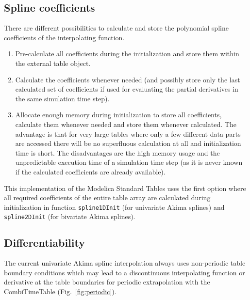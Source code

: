 \documentclass[11pt,a4paper,twocolumn]{article}
\begin{document}
\subsection{Spline coefficients}
There are different possibilities to calculate and store the polynomial spline coefficients of the interpolating function.
\begin{enumerate}
\item Pre-calculate all coefficients during the initialization and store them within the external table object.
\item Calculate the coefficients whenever needed (and possibly store only the last calculated set of coefficients if used for evaluating the partial derivatives in the same simulation time step).
\item Allocate enough memory during initialization to store all coefficients, calculate them whenever needed and store them whenever calculated. The advantage is that for very large tables where only a few different data parts are accessed there will be no superfluous calculation at all and initialization time is short. The disadvantages are the high memory usage and the unpredictable execution time of a simulation time step (as it is never known if the calculated coefficients are already available).
\end{enumerate}
This implementation of the Mod\-el\-ica Standard Tables uses the first option where all required coefficients of the entire table array are calculated during initialization in function \texttt{spline1DInit} (for univariate Akima splines) and \texttt{spline2DInit} (for bivariate Akima splines).

\subsection{Differentiability}
The current univariate Akima spline interpolation always uses non-periodic table boundary conditions which may lead to a discontinuous interpolating function or derivative at the table boundaries for periodic extrapolation with the CombiTimeTable (Fig.~\ref{fig:periodic}).
\end{document}
